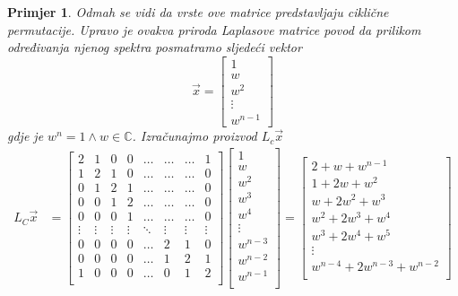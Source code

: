 \documentclass[11pt]{article}
\newtheorem{example}{Primjer}
\begin{document}
\begin{example}
	Odmah se vidi da vrste ove matrice predstavljaju ciklične permutacije.
	Upravo je ovakva priroda Laplasove matrice povod da prilikom određivanja njenog spektra posmatramo sljedeći vektor 
	\[ \vec{x} =
	\begin{bmatrix}
	1 \\
	w \\
	w^2\\
	\vdots \\
	w^{n-1}
	\end{bmatrix}
	\]
	gdje je $w^n = 1 \land w \in \mathbb{C}$. Izračunajmo proizvod $L_c \vec{x}$
	\[
	\begin{split}
	  	L_C \vec{x} & = 
		\begin{bmatrix}
		2 & 1 & 0 & 0 & \dots & \dots & \dots & 1 \\
		1 & 2 & 1 & 0 & \dots & \dots & \dots & 0 \\
		0 & 1 & 2 & 1 & \dots & \dots & \dots & 0 \\
		0 & 0 & 1 & 2 & \dots & \dots & \dots & 0 \\
		0 & 0 & 0 & 1 & \dots & \dots & \dots & 0 \\
		\vdots  & \vdots  & \vdots  & \vdots  & \ddots & \vdots & \vdots & \vdots  \\
		0 & 0 & 0 & 0 & \dots & 2 & 1 & 0 \\
		0 & 0 & 0 & 0 & \dots & 1 & 2 & 1 \\
		1 & 0 & 0 & 0 & \dots & 0 & 1 & 2 \\
		\end{bmatrix}
		 \begin{bmatrix}
		1 \\
		w \\
		w^2 \\
		w^3 \\
		w^4 \\
		\vdots \\
		w^{n-3} \\
		w^{n-2} \\
		w^{n-1} \\
		\end{bmatrix} 
		=
		\begin{bmatrix}
		 2 + w + w^{n-1} \\
		1 + 2w + w^2 \\
		w + 2w^2 + w^3 \\
		w^2 + 2w^3 + w^4 \\
		w^3 + 2w^4 + w^5 \\
		\vdots \\
		w^{n-4} + 2w^{n-3} + w^{n-2} \\

\end{bmatrix}
\end{split}\]
\end{example}
\end{document}
